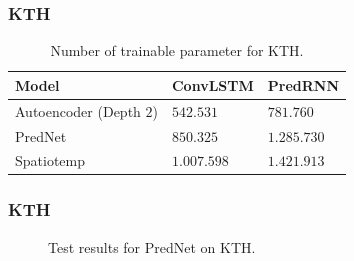   \begin{frame}
   \frametitle{KTH}
   
   \begin{table}[H]
    \begin{center}
     \begin{tabular}{| l | l | l |}\hline
      \textbf{Model} & \textbf{ConvLSTM} & \textbf{PredRNN} \\\hline
      Autoencoder (Depth $2$) & $542.531$ & $781.760$ \\\hline
      PredNet & $850.325$ & $1.285.730$ \\\hline
      Spatiotemp & $1.007.598$ & $1.421.913$ \\\hline
     \end{tabular}
    \end{center}
    \caption{Number of trainable parameter for KTH.}
   \end{table}
   
  \end{frame}
  \begin{frame}
   \frametitle{KTH}
   
   \begin{figure}[H]
   \centering
   \qquad
   \qquad
   \caption{Test results for PredNet on KTH.}
   \label{figure::prednet_kth_results}
  \end{figure}
  
  \end{frame}
